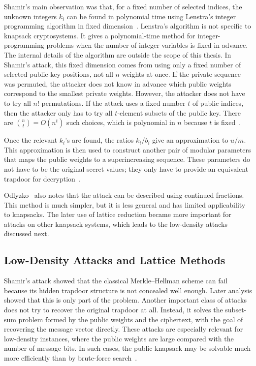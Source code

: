Shamir's main observation was that, for a fixed number of selected indices, the
unknown integers \(k_i\) can be found in polynomial time using Lenstra's
integer programming algorithm in fixed
dimension~\cite{Lenstra1983IntegerProgramming}. Lenstra's algorithm is not
specific to knapsack cryptosystems. It gives a polynomial-time method for
integer-programming problems when the number of integer variables is fixed in
advance. The internal details of the algorithm are outside the scope of this
thesis. In Shamir's attack, this fixed dimension comes from using only a fixed
number of selected public-key positions, not all \(n\) weights at once. If the
private sequence was permuted, the attacker does not know in advance which
public weights correspond to the smallest private weights. However, the
attacker does not have to try all \(n!\) permutations. If the attack uses a
fixed number \(t\) of public indices, then the attacker only has to try all
\(t\)-element subsets of the public key. There are \(\binom{n}{t}=O(n^t)\) such
choices, which is polynomial in \(n\) because \(t\) is
fixed~\cite{OdlyzkoRiseFall}.

Once the relevant \(k_i\)'s are found, the ratios \(k_i/b_i\) give an
approximation to \(u/m\). This approximation is then used to construct another
pair of modular parameters that maps the public weights to a superincreasing
sequence. These parameters do not have to be the original secret values; they
only have to provide an equivalent trapdoor for
decryption~\cite{OdlyzkoRiseFall}.

Odlyzko~\cite{OdlyzkoRiseFall} also notes that the attack can be described using continued
fractions. This method is much simpler, but it is less general and has limited
applicability to knapsacks. The later use of lattice
reduction became more important for attacks on other knapsack systems, which
leads to the low-density attacks discussed next.

\subsection{Low-Density Attacks and Lattice Methods}

Shamir's attack showed that the classical Merkle--Hellman scheme can fail
because its hidden trapdoor structure is not concealed well enough. Later
analysis showed that this is only part of the problem. Another important class
of attacks does not try to recover the original trapdoor at all. Instead, it
solves the subset-sum problem formed by the public weights and the ciphertext,
with the goal of recovering the message vector directly. These attacks are
especially relevant for low-density instances, where the public weights are
large compared with the number of message bits. In such cases, the public
knapsack may be solvable much more efficiently than by brute-force
search~\cite{OdlyzkoRiseFall}.

